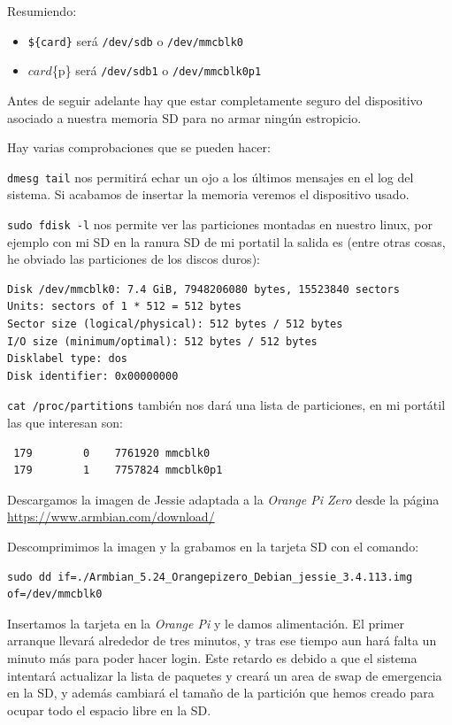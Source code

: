 \documentclass[12pt,spanish,]{article}
\providecommand{\tightlist}{%
  \setlength{\itemsep}{0pt}\setlength{\parskip}{0pt}}
\begin{document}
Resumiendo:

\begin{itemize}
\tightlist
\item
  \texttt{\$\{card\}} será \texttt{/dev/sdb} o \texttt{/dev/mmcblk0}
\item
  \({card}\)\{p\} será \texttt{/dev/sdb1} o \texttt{/dev/mmcblk0p1}
\end{itemize}

Antes de seguir adelante hay que estar completamente seguro del
dispositivo asociado a nuestra memoria SD para no armar ningún
estropicio.

Hay varias comprobaciones que se pueden hacer:

\texttt{dmesg\ \textbar{}tail} nos permitirá echar un ojo a los últimos
mensajes en el log del sistema. Si acabamos de insertar la memoria
veremos el dispositivo usado.

\texttt{sudo\ fdisk\ -l} nos permite ver las particiones montadas en
nuestro linux, por ejemplo con mi SD en la ranura SD de mi portatil la
salida es (entre otras cosas, he obviado las particiones de los discos
duros):

\begin{verbatim}
Disk /dev/mmcblk0: 7.4 GiB, 7948206080 bytes, 15523840 sectors
Units: sectors of 1 * 512 = 512 bytes
Sector size (logical/physical): 512 bytes / 512 bytes
I/O size (minimum/optimal): 512 bytes / 512 bytes
Disklabel type: dos
Disk identifier: 0x00000000
\end{verbatim}

\texttt{cat\ /proc/partitions} también nos dará una lista de
particiones, en mi portátil las que interesan son:

\begin{verbatim}
 179        0    7761920 mmcblk0
 179        1    7757824 mmcblk0p1
\end{verbatim}

Descargamos la imagen de Jessie adaptada a la \emph{Orange Pi Zero}
desde la página \url{https://www.armbian.com/download/}

Descomprimimos la imagen y la grabamos en la tarjeta SD con el comando:

\begin{verbatim}
sudo dd if=./Armbian_5.24_Orangepizero_Debian_jessie_3.4.113.img of=/dev/mmcblk0
\end{verbatim}

Insertamos la tarjeta en la \emph{Orange Pi} y le damos alimentación. El
primer arranque llevará alrededor de tres minutos, y tras ese tiempo aun
hará falta un minuto más para poder hacer login. Este retardo es debido
a que el sistema intentará actualizar la lista de paquetes y creará un
area de swap de emergencia en la SD, y además cambiará el tamaño de la
partición que hemos creado para ocupar todo el espacio libre en la SD.
\end{document}
